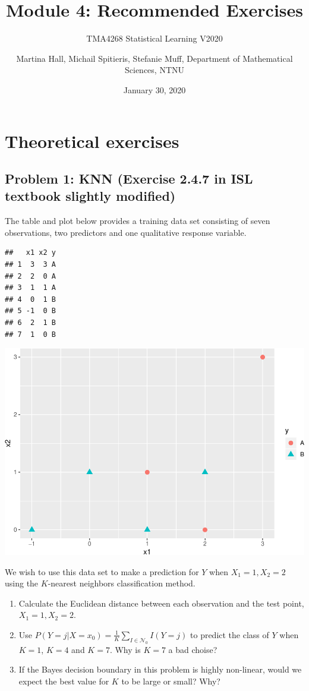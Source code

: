 \documentclass[]{article}
\title{Module 4: Recommended Exercises}
\subtitle{TMA4268 Statistical Learning V2020}
\author{Martina Hall, Michail Spitieris, Stefanie Muff, Department of
Mathematical Sciences, NTNU}
\date{January 30, 2020}
\providecommand{\tightlist}{%
  \setlength{\itemsep}{0pt}\setlength{\parskip}{0pt}}
\begin{document}
\maketitle

\section{Theoretical exercises}\label{theoretical-exercises}

\subsection{Problem 1: KNN (Exercise 2.4.7 in ISL textbook slightly
modified)}\label{problem-1-knn-exercise-2.4.7-in-isl-textbook-slightly-modified}

The table and plot below provides a training data set consisting of
seven observations, two predictors and one qualitative response
variable.

\begin{verbatim}
##   x1 x2 y
## 1  3  3 A
## 2  2  0 A
## 3  1  1 A
## 4  0  1 B
## 5 -1  0 B
## 6  2  1 B
## 7  1  0 B
\end{verbatim}

\begin{center}\includegraphics[width=0.7\linewidth]{RecEx4_files/figure-latex/unnamed-chunk-1-1} \end{center}

We wish to use this data set to make a prediction for \(Y\) when
\(X_1=1, X_2=2\) using the \(K\)-nearest neighbors classification
method.

\begin{enumerate}
\def\labelenumi{\alph{enumi}.}
\tightlist
\item
  Calculate the Euclidean distance between each observation and the test
  point, \(X_1=1,X_2=2\).
\item
  Use \(P(Y=j|X=x_0) = \frac{1}{K}\sum_{I \in \mathcal{N}_0}I(Y=j)\) to
  predict the class of \(Y\) when \(K=1\), \(K=4\) and \(K=7\). Why is
  \(K=7\) a bad choise?
\item
  If the Bayes decision boundary in this problem is highly non-linear,
  would we expect the best value for \(K\) to be large or small? Why?
\end{enumerate}
\end{document}
